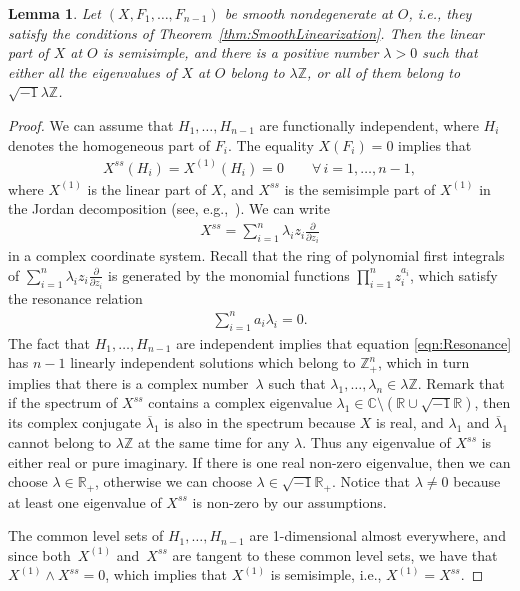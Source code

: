 \documentclass[11pt]{article}
\numberwithin{equation}{section}
\newtheorem{lem}[thm]{Lemma}
\newcommand{\bbR}{\mathbb R}
\newcommand{\bbC}{\mathbb C}
\newcommand{\bbZ}{\mathbb Z}
\begin{document}
\begin{lem} \label{lem:HypOrEl}
 Let $(X,F_1,\dots,F_{n-1})$ be smooth nondegenerate at $O$, i.e., they satisfy the conditions of Theorem~{\rm \ref{thm:SmoothLinearization}}.
Then the linear part of $X$ at $O$ is semisimple, and there is a positive number $\lambda > 0$ such that either all the eigenvalues of $X$ at $O$ belong to $\lambda \bbZ$, or all of them belong to $\sqrt{-1} \lambda \bbZ$.
\end{lem}

\begin{proof} We can assume that $H_1,\dots,H_{n-1}$ are functionally independent, where $H_i$ denotes the homogeneous part
of $F_i$. The equality $X(F_i) = 0$ implies that
\begin{gather*}
 X^{ss}(H_i) = X^{(1)}(H_i) = 0 \qquad \forall \, i=1,\dots,n-1,
\end{gather*}
where $X^{(1)}$ is the linear part of $X$, and $X^{ss}$ is the semisimple part of $X^{(1)}$ in the Jordan decomposition
(see, e.g.,~\cite{Zung-Poincare2002,Zung-Nondegenerate2015}). We can write
\begin{gather*}
 X^{ss} = \sum_{i=1}^n \lambda_i z_i \frac{\partial}{\partial z_i}
\end{gather*}
in a complex coordinate system. Recall that the ring of polynomial f\/irst integrals of $\sum\limits_{i=1}^n \lambda_i z_i \frac{\partial}{\partial z_i}$ is generated by the monomial functions $\prod\limits_{i=1}^n z_i^{a_i}$, which satisfy the resonance relation
\begin{gather} \label{eqn:Resonance}
 \sum_{i=1}^n a_i \lambda_i = 0.
\end{gather}
The fact that $H_1,\dots, H_{n-1}$ are independent implies that equation \eqref{eqn:Resonance} has $n-1$ linearly
independent solutions which belong to $\bbZ^n_+$, which in turn implies that there is a complex number~$\lambda$ such that $\lambda_1,\dots, \lambda_n \in \lambda \bbZ$. Remark that if the spectrum of $X^{ss}$ contains
a complex eigenvalue $\lambda_1 \in \bbC \setminus (\bbR \cup \sqrt{-1}\bbR)$, then its complex conjugate $\overline \lambda_1$
is also in the spectrum because $X$ is real, and $\lambda_1$ and $\overline \lambda_1$ cannot belong to $\lambda\bbZ$
at the same time for any $\lambda$. Thus any eigenvalue of $X^{ss}$ is either real or pure imaginary. If there is one real
non-zero eigenvalue, then we can choose $\lambda \in \bbR_+$, otherwise we can choose $\lambda \in \sqrt{-1}\bbR_+$.
Notice that $\lambda \neq 0$ because at least one eigenvalue of $X^{ss}$ is non-zero by our assumptions.

The common level sets of $H_1, \dots, H_{n-1}$ are 1-dimensional almost everywhere, and since both~$X^{(1)}$
and~$X^{ss}$ are tangent to these common level sets, we have that $X^{(1)} \wedge X^{ss} = 0$, which implies that
$X^{(1)}$ is semisimple, i.e., $X^{(1)} = X^{ss}$.
\end{proof}
\end{document}
